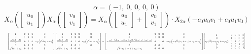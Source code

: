 \documentclass[11pt]{article}
\theoremstyle{definition}
\begin{document}
\[
\alpha = \left( -1, \  0, \  0, \  0, \  0\right)
\]
\[
X_{\alpha}\left(\left[\begin{matrix}u_{0}\\u_{1}\end{matrix}\right]\right) X_{\alpha}\left(\left[\begin{matrix}v_{0}\\v_{1}\end{matrix}\right]\right) = X_{\alpha}\left(\left[\begin{matrix}u_{0}\\u_{1}\end{matrix}\right] + \left[\begin{matrix}v_{0}\\v_{1}\end{matrix}\right]\right) \cdot X_{2\alpha}\left(- c_{0} u_{0} v_{1} + c_{0} u_{1} v_{0}\right)
\]
\[
\resizebox{\textwidth}{!}{${\left[\begin{matrix}1 & 0 & 0 & 0 & 0\\0 & 1 & 0 & 0 & 0\\\frac{c_{0} \left(d u_{1}^{2} - u_{0}^{2}\right)}{2} & 0 & 1 & 0 & c_{0} \left(\sqrt{d} u_{1} - u_{0}\right)\\0 & 0 & 0 & 1 & 0\\\sqrt{d} u_{1} + u_{0} & 0 & 0 & 0 & 1\end{matrix}\right]} {\left[\begin{matrix}1 & 0 & 0 & 0 & 0\\0 & 1 & 0 & 0 & 0\\\frac{c_{0} \left(d v_{1}^{2} - v_{0}^{2}\right)}{2} & 0 & 1 & 0 & c_{0} \left(\sqrt{d} v_{1} - v_{0}\right)\\0 & 0 & 0 & 1 & 0\\\sqrt{d} v_{1} + v_{0} & 0 & 0 & 0 & 1\end{matrix}\right]} = {\left[\begin{matrix}1 & 0 & 0 & 0 & 0\\0 & 1 & 0 & 0 & 0\\- \frac{c_{0} \left(- \sqrt{d} \left(u_{1} + v_{1}\right) + u_{0} + v_{0}\right) \left(\sqrt{d} \left(u_{1} + v_{1}\right) + u_{0} + v_{0}\right)}{2} & 0 & 1 & 0 & - c_{0} \left(- \sqrt{d} \left(u_{1} + v_{1}\right) + u_{0} + v_{0}\right)\\0 & 0 & 0 & 1 & 0\\\sqrt{d} \left(u_{1} + v_{1}\right) + u_{0} + v_{0} & 0 & 0 & 0 & 1\end{matrix}\right]} {\left[\begin{matrix}1 & 0 & 0 & 0 & 0\\0 & 1 & 0 & 0 & 0\\c_{0} \sqrt{d} \left(- u_{0} v_{1} + u_{1} v_{0}\right) & 0 & 1 & 0 & 0\\0 & 0 & 0 & 1 & 0\\0 & 0 & 0 & 0 & 1\end{matrix}\right]}$}
\]
\end{document}
